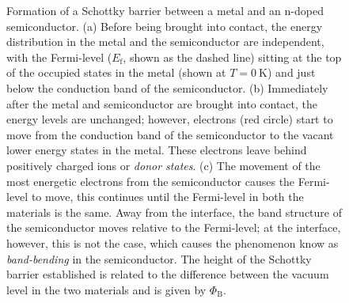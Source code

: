 \begin{figure}[t]
\begin{center}
\caption[Formation of a Schottky barrier]{Formation of a Schottky barrier between a metal and an n-doped semiconductor. (a) Before being brought into contact, the energy distribution in the metal and the semiconductor are independent, with the Fermi-level ($E_{\mathrm{f}}$, shown as the dashed line) sitting at the top of the occupied states in the metal (shown at $T = 0~\mathrm{K}$) and just below the conduction band of the semiconductor. (b) Immediately after the metal and semiconductor are brought into contact, the energy levels are unchanged; however, electrons (red circle) start to move from the conduction band of the semiconductor to the vacant lower energy states in the metal. These electrons leave behind positively charged ions or \textit{donor states}. (c) The movement of the most energetic electrons from the semiconductor causes the Fermi-level to move, this continues until the Fermi-level in both the materials is the same. Away from the interface, the band structure of the semiconductor moves relative to the Fermi-level; at the interface, however, this is not the case, which causes the phenomenon know as \textit{band-bending} in the semiconductor. The height of the Schottky barrier established is related to the difference between the vacuum level in the two materials and is given by $\varPhi_{\mathrm{B}}$.} \label{fig:SchottkyFormation}

\end{center}
\end{figure}
